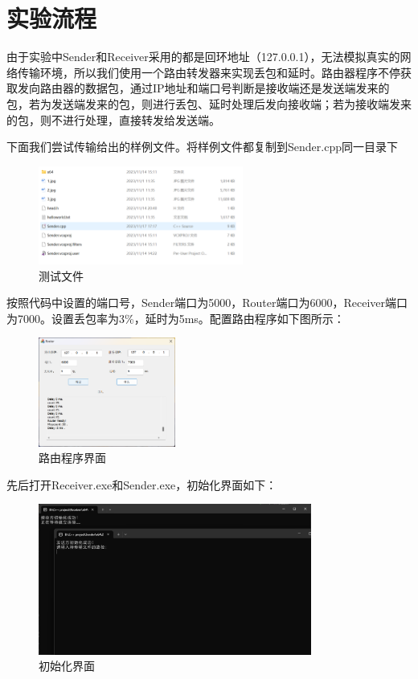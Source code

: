 \documentclass[UTF8,a4paper,10pt]{ctexart}
\begin{document}
\section{实验流程}
由于实验中Sender和Receiver采用的都是回环地址（127.0.0.1），无法模拟真实的网络传输环境，所以我们使用一个路由转发器来实现丢包和延时。路由器程序不停获取发向路由器的数据包，通过IP地址和端口号判断是接收端还是发送端发来的包，若为发送端发来的包，则进行丢包、延时处理后发向接收端；若为接收端发来的包，则不进行处理，直接转发给发送端。\par
下面我们尝试传输给出的样例文件。将样例文件都复制到Sender.cpp同一目录下
\begin{figure}[H]
    \centering
\includegraphics[width=0.6\textwidth]{img/测试文件.png}
    \caption{测试文件}
\end{figure}
按照代码中设置的端口号，Sender端口为5000，Router端口为6000，Receiver端口为7000。设置丢包率为3\%，延时为5ms。配置路由程序如下图所示：
\begin{figure}[H]
    \centering
\includegraphics[width=0.4\textwidth]{img/路由程序界面.png}
    \caption{路由程序界面}
\end{figure}
先后打开Receiver.exe和Sender.exe，初始化界面如下：
\begin{figure}[H]
    \centering
\includegraphics[width=0.8\textwidth]{img/初始化界面.png}
    \caption{初始化界面}
\end{figure}
\end{document}
